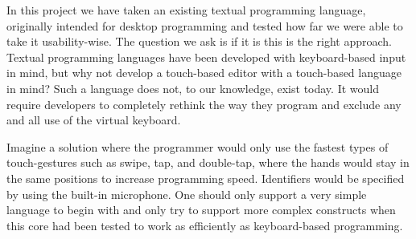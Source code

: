 In this project we have taken an existing textual programming language, originally intended for desktop programming and tested how far we were able to take it usability-wise. The question we ask is if it is this is the right approach. Textual programming languages have been developed with keyboard-based input in mind, but why not develop a touch-based editor with a touch-based language in mind? Such a language does not, to our knowledge, exist today. It would require developers to completely rethink the way they program and exclude any and all use of the virtual keyboard.

Imagine a solution where the programmer would only use the fastest types of touch-gestures such as swipe, tap, and double-tap, where the hands would stay in the same positions to increase programming speed. Identifiers would be specified by using the built-in microphone. One should only support a very simple language to begin with and only try to support more complex constructs when this core had been tested to work as efficiently as keyboard-based programming.

